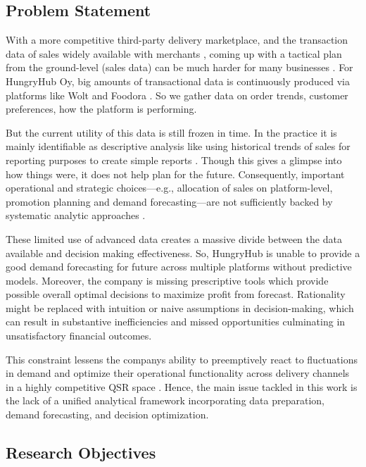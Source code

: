 \subsection{Problem Statement}

With a more competitive third-party delivery marketplace, and the transaction data of sales widely available with merchants \citep{ogunmokun2025role}, coming up with a tactical plan from the ground-level (sales data) can be much harder for many businesses \citep{taylor2017new}. For HungryHub Oy, big amounts of transactional data is continuously produced via platforms like Wolt and Foodora \citep{mbare2023psychosocial}. So we gather data on order trends, customer preferences, how the platform is performing.


But the current utility of this data is still frozen in time. In the practice it is mainly identifiable as descriptive analysis like using historical trends of sales for reporting purposes to create simple reports \citep{wolniak2023concept}. Though this gives a glimpse into how things were, it does not help plan for the future. Consequently, important operational and strategic choices—e.g., allocation of sales on platform-level, promotion planning and demand forecasting—are not sufficiently backed by systematic analytic approaches \citep{groene2024introduction}.


These limited use of advanced data creates a massive divide between the data available and decision making effectiveness. So, HungryHub is unable to provide a good demand forecasting for future across multiple platforms without predictive models. Moreover, the company is missing prescriptive tools which provide possible overall optimal decisions to maximize profit from forecast. Rationality might be replaced with intuition or naive assumptions in decision-making, which can result in substantive inefficiencies and missed opportunities culminating in unsatisfactory financial outcomes.


This constraint lessens the companys ability to preemptively react to fluctuations in demand and optimize their operational functionality across delivery channels in a highly competitive QSR space \citep{racine2022college}. Hence, the main issue tackled in this work is the lack of a unified analytical framework incorporating data preparation, demand forecasting, and decision optimization.

\subsection{Research Objectives}

